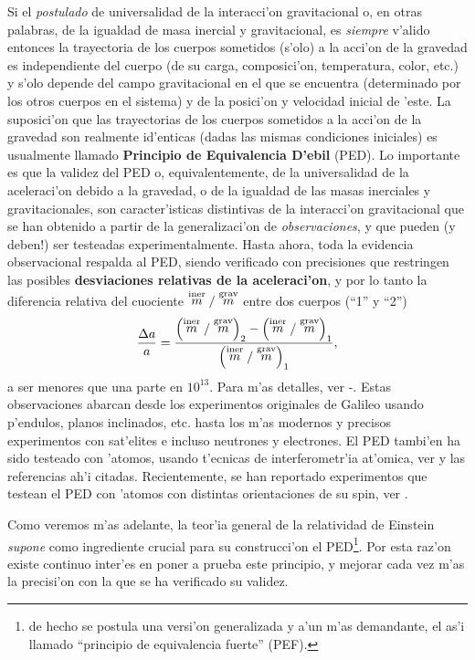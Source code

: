 Si el \textit{postulado} de universalidad de la interacci'on gravitacional o, en otras palabras, de la igualdad de masa inercial y gravitacional, es \textit{siempre} v'alido entonces la trayectoria de los cuerpos sometidos (s'olo) a la acci'on de la gravedad es independiente del cuerpo (de su carga, composici'on, temperatura, color, etc.) y s'olo depende del campo gravitacional en el que se encuentra (determinado por los otros cuerpos en el sistema) y de la posici'on y velocidad inicial de 'este. La suposici'on que las trayectorias de los cuerpos sometidos a la acci'on de la gravedad son realmente id'enticas (dadas las mismas condiciones iniciales) es usualmente llamado \textbf{Principio de Equivalencia D'ebil} (PED). Lo importante es que la validez del PED o, equivalentemente, de la universalidad de la aceleraci'on debido a la gravedad, o de la igualdad de las masas inerciales y gravitacionales, son caracter'isticas distintivas de la interacci'on gravitacional que se han obtenido a partir de la generalizaci'on de \textit{observaciones}, y que pueden (y deben!) ser testeadas experimentalmente. Hasta ahora, toda la evidencia observacional respalda al PED, siendo verificado con precisiones que restringen las posibles \textbf{desviaciones relativas de la aceleraci'on}, y por lo tanto la diferencia relativa del cuociente $\stackrel{\rm iner}{m}/\stackrel{\rm grav}{m}$ entre dos cuerpos (``1'' y ``2'')
\begin{equation}
\frac{\Delta a}{a}=\frac{\left(\stackrel{\rm iner}{m}/\stackrel{\rm grav}{m}\right)_2-\left(\stackrel{\rm iner}{m}/\stackrel{\rm grav}{m}\right)_1}{\left(\stackrel{\rm iner}{m}/\stackrel{\rm grav}{m}\right)_1},
\end{equation}
a ser menores que una parte en $10^{13}$. Para m'as detalles, ver \cite{Will06}-\cite{STEP}.
Estas observaciones abarcan desde los experimentos originales de Galileo usando p'endulos, planos inclinados, etc. hasta los m'as modernos y precisos experimentos con sat'elites e incluso neutrones \cite{Koester76} y electrones. El PED tambi'en ha sido testeado con 'atomos, usando t'ecnicas de interferometr'ia at'omica, ver \cite{Zhou15} y las referencias ah'i citadas. Recientemente, se han reportado experimentos que testean el PED con 'atomos con distintas orientaciones de su spin, ver \cite{Duan16}.

Como veremos m'as adelante, la teor'ia general de la relatividad de Einstein \textit{supone} como ingrediente crucial para su construcci'on el PED\footnote{de hecho se postula una versi'on generalizada y a'un m'as demandante, el as'i llamado ``principio de equivalencia fuerte'' (PEF).}. Por esta raz'on existe continuo inter'es en poner a prueba este principio, y mejorar cada vez m'as la precisi'on con la que se ha verificado su validez.

